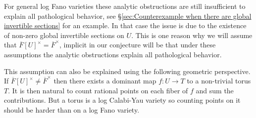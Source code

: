 \documentclass[a4paper,11pt,reqno]{amsart}
\theoremstyle{definition}
\begin{document}
For general log Fano varieties these analytic obstructions are still insufficient to explain all pathological behavior, see \S\ref{sec:Counterexample when there are global invertible sections} for an example. In that case the issue is due to the existence of non-zero global invertible sections on $U$. This is one reason why we will assume that $\overline{F}[U]^{\times} = \overline{F}^{\times}$, implicit in our conjecture will be that under these assumptions the analytic obstructions explain all pathological behavior.

This assumption can also be explained using the following geometric perspective. If $\overline{F}[U]^{\times} \neq \overline{F}^{\times}$ then there exists a dominant map $f:U \to T$ to a non-trivial torus $T$. It is then natural to count rational points on each fiber of $f$ and sum the contributions. But a torus is a log Calabi-Yau variety so counting points on it should be harder than on a log Fano variety.
\end{document}
